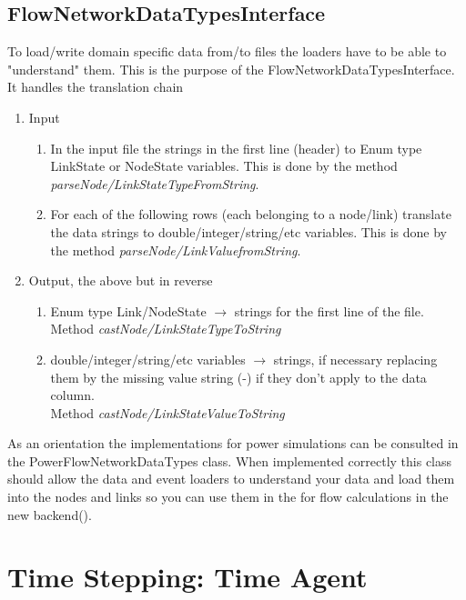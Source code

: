\documentclass[11pt,fleqn]{book} %
\newcommand{\TimeAgent}{Time Agent }
\newcommand{\backend}[1][]{backend#1}
\newcommand{\domain}[1][]{domain#1}
\begin{document}
\subsection{FlowNetworkDataTypesInterface}
To load/write \domain{} specific data from/to files the loaders have to be able to "understand" them. This is the purpose of the FlowNetworkDataTypesInterface. It handles the translation chain 
\begin{enumerate}
	\item Input
	\begin{enumerate}
		\item In the input file the strings in the first line (header) to Enum type LinkState or NodeState variables. This is done by the method \textit{parseNode/LinkStateTypeFromString}.
		\item For each of the following rows (each belonging to a node/link) translate the data strings to double/integer/string/etc variables. This is done by the method \textit{parseNode/LinkValuefromString}.
	\end{enumerate}
	\item Output, the above but in reverse
	\begin{enumerate}
		\item Enum type Link/NodeState $\rightarrow$ strings for the first line of the file. \\ Method \textit{castNode/LinkStateTypeToString}
		\item double/integer/string/etc variables $\rightarrow$ strings, if necessary replacing them by the missing value string (-) if they don't apply to the data column. \\ Method \textit{castNode/LinkStateValueToString}
	\end{enumerate}
\end{enumerate}

As an orientation the implementations for power simulations can be consulted in the PowerFlowNetworkDataTypes class. When implemented correctly this class should allow the data and event loaders to understand your data and load them into the nodes and links so you can use them in the for flow calculations in the new \backend().

\section{Time Stepping: \TimeAgent }

\end{document}
